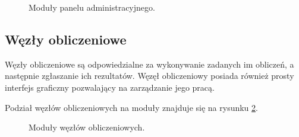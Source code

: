\documentclass[a4paper,11pt,twoside]{report}
\theoremstyle{definition}
\begin{document}
\begin{figure}[ht] 
	\caption{Moduły panelu administracyjnego.}
	\label{admin-panel-model}
\end{figure}

\subsection{Węzły obliczeniowe}

Węzły obliczeniowe są odpowiedzialne za wykonywanie zadanych im obliczeń, a następnie zgłaszanie ich rezultatów. Węzęł obliczeniowy posiada również prosty interfejs graficzny pozwalający na zarządzanie jego pracą.

Podział węzłów obliczeniowych na moduły znajduje się na rysunku \ref{node-model}.

\begin{figure}[ht] 
	\caption{Moduły węzłów obliczeniowych.}
	\label{node-model}
\end{figure}
\end{document}
